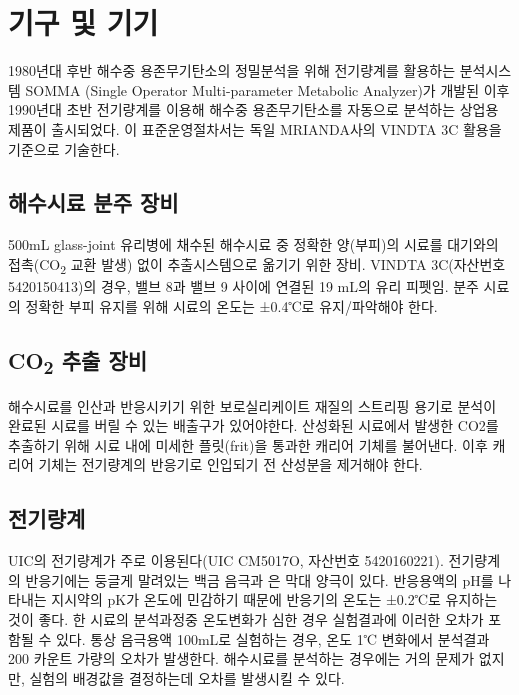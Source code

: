 \documentclass[
]{book}
\begin{document}
\hypertarget{uxae30uxad6c-uxbc0f-uxae30uxae30-6}{%
\section{기구 및 기기}\label{uxae30uxad6c-uxbc0f-uxae30uxae30-6}}

1980년대 후반 해수중 용존무기탄소의 정밀분석을 위해 전기량계를 활용하는 분석시스템 SOMMA (Single Operator Multi-parameter Metabolic Analyzer)가 개발된 이후 1990년대 초반 전기량계를 이용해 해수중 용존무기탄소를 자동으로 분석하는 상업용 제품이 출시되었다. 이 표준운영절차서는 독일 MRIANDA사의 VINDTA 3C 활용을 기준으로 기술한다.

\hypertarget{uxd574uxc218uxc2dcuxb8cc-uxbd84uxc8fc-uxc7a5uxbe44}{%
\subsection{해수시료 분주 장비}\label{uxd574uxc218uxc2dcuxb8cc-uxbd84uxc8fc-uxc7a5uxbe44}}

500mL glass-joint 유리병에 채수된 해수시료 중 정확한 양(부피)의 시료를 대기와의 접촉(CO\textsubscript{2} 교환 발생) 없이 추출시스템으로 옮기기 위한 장비. VINDTA 3C(자산번호 5420150413)의 경우, 밸브 8과 밸브 9 사이에 연결된 19 mL의 유리 피펫임. 분주 시료의 정확한 부피 유지를 위해 시료의 온도는 ±0.4℃로 유지/파악해야 한다.

\hypertarget{co2-uxcd94uxcd9c-uxc7a5uxbe44}{%
\subsection{\texorpdfstring{CO\textsubscript{2} 추출 장비}{CO2 추출 장비}}\label{co2-uxcd94uxcd9c-uxc7a5uxbe44}}

해수시료를 인산과 반응시키기 위한 보로실리케이트 재질의 스트리핑 용기로 분석이 완료된 시료를 버릴 수 있는 배출구가 있어야한다. 산성화된 시료에서 발생한 CO2를 추출하기 위해 시료 내에 미세한 플릿(frit)을 통과한 캐리어 기체를 불어낸다. 이후 캐리어 기체는 전기량계의 반응기로 인입되기 전 산성분을 제거해야 한다.

\hypertarget{uxc804uxae30uxb7c9uxacc4}{%
\subsection{전기량계}\label{uxc804uxae30uxb7c9uxacc4}}

UIC의 전기량계가 주로 이용된다(UIC CM5017O, 자산번호 5420160221). 전기량계의 반응기에는 둥글게 말려있는 백금 음극과 은 막대 양극이 있다. 반응용액의 pH를 나타내는 지시약의 pK가 온도에 민감하기 때문에 반응기의 온도는 ±0.2℃로 유지하는 것이 좋다. 한 시료의 분석과정중 온도변화가 심한 경우 실험결과에 이러한 오차가 포함될 수 있다. 통상 음극용액 100mL로 실험하는 경우, 온도 1℃ 변화에서 분석결과 200 카운트 가량의 오차가 발생한다. 해수시료를 분석하는 경우에는 거의 문제가 없지만, 실험의 배경값을 결정하는데 오차를 발생시킬 수 있다.
\end{document}

